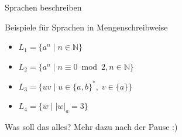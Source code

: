 \begin{frame}[fragile]{Sprachen beschreiben}
    \begin{exampleblock}{Beispiele für Sprachen in Mengenschreibweise}
    \begin{itemize}
        \item $L_1 = \{a^n\;|\;n\in\mathbb{N}\}$
        \item $L_2 = \{a^n\;|\;n \equiv 0 \bmod 2, n\in\mathbb{N}\}$
        \item $L_3 = \{uv\;|\;u\in\{a,b\}^\ast,\;v\in\{a\}\}$
        \item $L_4 = \{w\;|\;|w|_a = 3\}$
    \end{itemize}
    \end{exampleblock}
    Was soll das alles? Mehr dazu nach der Pause :)
\end{frame}
